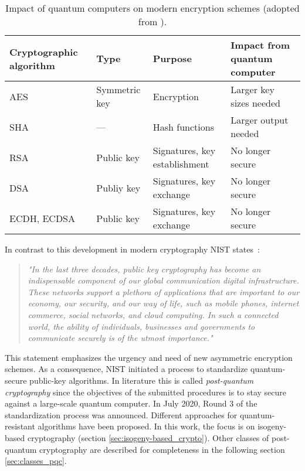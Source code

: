 \begin{table}[H]
  \centering
  \begin{tabular}{|K{3cm}|K{3cm}|K{4cm}|K{4cm}|}
	\hline
      \textbf{Cryptographic} \textbf{algorithm} & \textbf{Type} & \textbf{Purpose} & \textbf{Impact from} \textbf{ quantum computer} \\
	\hline
      AES & Symmetric key & Encryption & Larger key sizes needed \\
    \hline
      SHA & --- & Hash functions & Larger output needed \\
    \hline
      RSA & Public key & Signatures, key establishment & No longer secure \\
	\hline      
      DSA & Publiy key & Signatures, key exchange & No longer secure \\
    \hline
      ECDH, ECDSA & Public key & Signatures, key exchange & No longer secure \\
    \hline
  \end{tabular}
  \caption[Impact of quantum computers on modern encryption schemes]{Impact of quantum computers on modern encryption schemes (adopted from \parencite{chen2016report}).}\label{tab:impact}
\end{table}

In contrast to this development in modern cryptography NIST states~\parencite{chen2016report}:
\begin{quote}
\textit{"In the last three decades, public key cryptography has become an indispensable component of our global communication digital infrastructure. These networks support a plethora of applications that are important to our economy, our security, and our way of life, such as mobile phones, internet commerce, social networks, and cloud computing. In such a connected world, the ability of individuals, businesses and governments to communicate securely is of the utmost importance."}
\end{quote}
This statement emphasizes the urgency and need of new asymmetric encryption schemes. As a consequence, NIST initiated a process to standardize quantum-secure public-key algorithms. In literature this is called \textit{post-quantum cryptography} since the objectives of the submitted procedures is to stay secure against a large-scale quantum computer. In July 2020, Round 3 of the standardization process was announced. Different approaches for quantum-resistant algorithms have been proposed. In this work, the focus is on isogeny-based cryptography (section \ref{sec:isogeny-based_crypto}). Other classes of post-quantum cryptography are described for completeness in the following section \ref{sec:classes_pqc}.

